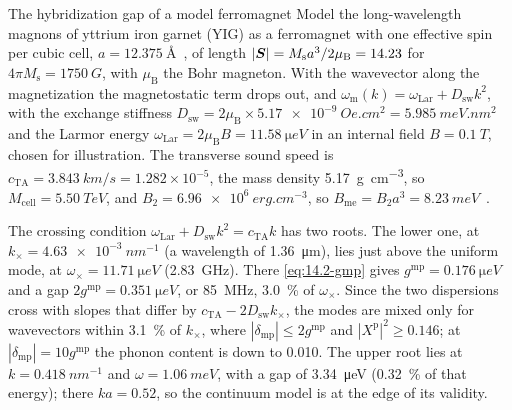 \begin{workedexample}{The hybridization gap of a model ferromagnet}\label{we:14-hybrid}
Model the long-wavelength magnons of yttrium iron garnet (YIG) as a ferromagnet with one effective spin per cubic cell, $a = \SI{12.375}{\angstrom}$~\cite{nakatsuka1995site}, of length $|\bm{S}| = M_{\mathrm{s}}a^3/2\mu_{\mathrm{B}} = 14.23$ for $4\pi M_{\mathrm{s}} = \SI{1750}{G}$, with $\mu_{\mathrm{B}}$ the Bohr magneton. With the wavevector along the magnetization the magnetostatic term drops out, and $\omega_{\mathrm{m}}(k) = \omega_{\mathrm{Lar}} + D_{\mathrm{sw}}k^2$, with the exchange stiffness $D_{\mathrm{sw}} = 2\mu_{\mathrm{B}}\times\SI{5.17e-9}{Oe.cm^2} = \SI{5.985}{meV.nm^2}$ and the Larmor energy $\omega_{\mathrm{Lar}} = 2\mu_{\mathrm{B}}B = \SI{11.58}{\micro eV}$ in an internal field $B = \SI{0.1}{T}$, chosen for illustration. The transverse sound speed is $c_{\mathrm{TA}} = \SI{3.843}{km/s} = 1.282\times10^{-5}$, the mass density \SI{5.17}{g.cm^{-3}}, so $M_{\mathrm{cell}} = \SI{5.50}{TeV}$, and $B_2 = \SI{6.96e6}{erg.cm^{-3}}$, so $B_{\mathrm{me}} = B_2a^3 = \SI{8.23}{meV}$~\cite[Eqs.~(2.13), (3.7), (3.15) and (3.16)]{ruckriegel2014magnetoelastic}.

The crossing condition $\omega_{\mathrm{Lar}} + D_{\mathrm{sw}}k^2 = c_{\mathrm{TA}}k$ has two roots. The lower one, at $k_\times = \SI{4.63e-3}{nm^{-1}}$ (a wavelength of \SI{1.36}{\micro m}), lies just above the uniform mode, at $\omega_\times = \SI{11.71}{\micro eV}$ (\SI{2.83}{GHz}). There \cref{eq:14.2-gmp} gives $g^{\mathrm{mp}} = \SI{0.176}{\micro eV}$ and a gap $2g^{\mathrm{mp}} = \SI{0.351}{\micro eV}$, or \SI{85}{MHz}, \SI{3.0}{\percent} of $\omega_\times$. Since the two dispersions cross with slopes that differ by $c_{\mathrm{TA}} - 2D_{\mathrm{sw}}k_\times$, the modes are mixed only for wavevectors within \SI{3.1}{\percent} of $k_\times$, where $|\delta_{\mathrm{mp}}| \le 2g^{\mathrm{mp}}$ and $|X^{\mathrm{p}}|^2 \ge 0.146$; at $|\delta_{\mathrm{mp}}| = 10g^{\mathrm{mp}}$ the phonon content is down to 0.010. The upper root lies at $k = \SI{0.418}{nm^{-1}}$ and $\omega = \SI{1.06}{meV}$, with a gap of \SI{3.34}{\micro eV} (\SI{0.32}{\percent} of that energy); there $ka = 0.52$, so the continuum model is at the edge of its validity.
\end{workedexample}


